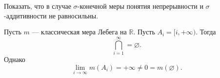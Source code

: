 \begin{task}{9}
Показать, что в случае $\sigma$-конечной меры понятия непрерывности и $\sigma$-аддитивности не равносильны.
\end{task}

\begin{solution}
Пусть $m$ --- классическая мера Лебега на $\mathbb{R}$. Пусть $A_i = [i, +\infty)$. Тогда
$$ \bigcap_{i=1}^{\infty} = \varnothing .$$
Однако
$$ \lim_{i \to \infty} m(A_i) = +\infty \neq 0 = m(\varnothing). $$
\end{solution}